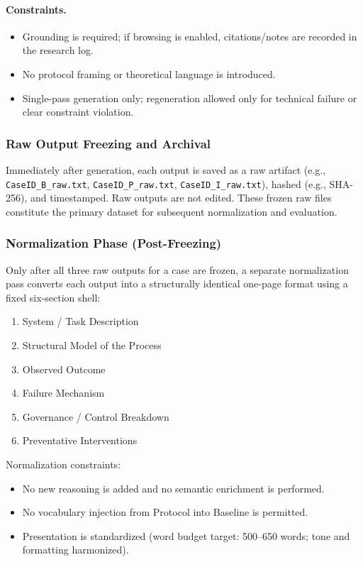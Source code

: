 \paragraph{Constraints.}
\begin{itemize}
    \item Grounding is required; if browsing is enabled, citations/notes are recorded in the research log.
    \item No protocol framing or theoretical language is introduced.
    \item Single-pass generation only; regeneration allowed only for technical failure or clear constraint violation.
\end{itemize}

\subsubsection{Raw Output Freezing and Archival}

Immediately after generation, each output is saved as a raw artifact (e.g., \texttt{CaseID\_B\_raw.txt}, \texttt{CaseID\_P\_raw.txt}, \texttt{CaseID\_I\_raw.txt}), hashed (e.g., SHA-256), and timestamped. Raw outputs are not edited. These frozen raw files constitute the primary dataset for subsequent normalization and evaluation.

\subsubsection{Normalization Phase (Post-Freezing)}

Only after all three raw outputs for a case are frozen, a separate normalization pass converts each output into a structurally identical one-page format using a fixed six-section shell:
\begin{enumerate}
    \item System / Task Description
    \item Structural Model of the Process
    \item Observed Outcome
    \item Failure Mechanism
    \item Governance / Control Breakdown
    \item Preventative Interventions
\end{enumerate}

Normalization constraints:
\begin{itemize}
    \item No new reasoning is added and no semantic enrichment is performed.
    \item No vocabulary injection from Protocol into Baseline is permitted.
    \item Presentation is standardized (word budget target: 500--650 words; tone and formatting harmonized).
\end{itemize}


